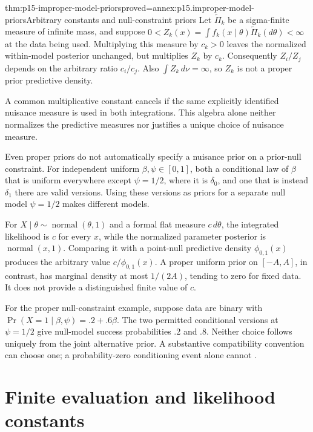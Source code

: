 \begin{hbtheorem}{thm:p15-improper-model-priors}{proved=annex:p15.improper-model-priors}{Arbitrary constants and null-constraint priors}
Let \(\widetilde\Pi_k\) be a sigma-finite measure of infinite mass, and
suppose \(0<Z_k(x)=\int f_k(x\mid\theta)\widetilde\Pi_k(d\theta)<\infty\)
at the data being used. Multiplying this measure by \(c_k>0\) leaves
the normalized within-model posterior unchanged, but multiplies \(Z_k\)
by \(c_k\). Consequently \(Z_i/Z_j\) depends on the arbitrary ratio
\(c_i/c_j\). Also \(\int Z_k\,d\nu=\infty\), so \(Z_k\) is not a
proper prior predictive density.

A common multiplicative constant cancels if the same explicitly identified
nuisance measure is used in both integrations. This algebra alone neither
normalizes the predictive measures nor justifies a unique choice of nuisance
measure.

Even proper priors do not automatically specify a nuisance prior on a
prior-null constraint. For independent uniform \(\beta,\psi\in[0,1]\),
both a conditional law of \(\beta\) that is uniform everywhere except
\(\psi=1/2\), where it is \(\delta_0\), and one that is instead
\(\delta_1\) there are valid versions. Using these versions as priors for
a separate null model \(\psi=1/2\) makes different models.
\end{hbtheorem}

For \(X\mid\theta\sim\operatorname{normal}(\theta,1)\) and a formal
flat measure \(c\,d\theta\), the integrated likelihood is \(c\) for every
\(x\), while the normalized parameter posterior is
\(\operatorname{normal}(x,1)\). Comparing it with a point-null predictive
density \(\phi_{0,1}(x)\) produces the arbitrary value
\(c/\phi_{0,1}(x)\). A proper uniform prior on \([-A,A]\), in contrast,
has marginal density at most \(1/(2A)\), tending to zero for fixed data.
It does not provide a distinguished finite value of \(c\).

For the proper null-constraint example, suppose data are binary with
\(\Pr(X=1\mid\beta,\psi)=.2+.6\beta\). The two permitted conditional
versions at \(\psi=1/2\) give null-model success probabilities .2 and .8.
Neither choice follows uniquely from the joint alternative prior.
A substantive compatibility convention can choose one; a probability-zero
conditioning event alone cannot
\cite[Secs.~5.1, 5.3]{KassRaftery1995BayesFactors}.

\section{Finite evaluation and likelihood constants}
\label{sec:p15-finite-model-evaluation}

